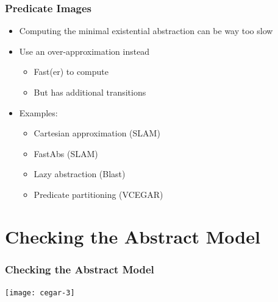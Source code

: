 \begin{frame}
\frametitle{Predicate Images}

\begin{itemize}

\item[\myfail] Computing the minimal existential abstraction can be way too slow
\vfill

\item Use an over-approximation instead
\begin{itemize}
\item[\mycheck] Fast(er) to compute
\item[\myfail] But has additional transitions
\end{itemize}
\vfill

\item Examples:
\begin{itemize}
\item Cartesian approximation (SLAM)
\item FastAbs (SLAM)
\item Lazy abstraction (Blast)
\item Predicate partitioning (VCEGAR)
\end{itemize}
\end{itemize}

\end{frame}


\section{Checking the Abstract Model}

\begin{frame}
\frametitle{Checking the Abstract Model}

\begin{center}
\texttt{[image: cegar-3]}
\end{center}

\end{frame}


